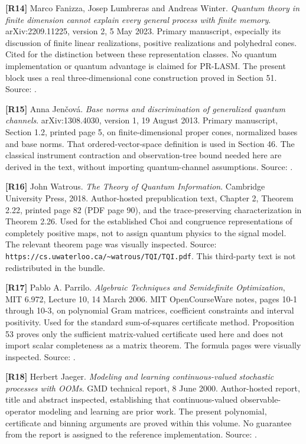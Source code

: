 \documentclass[11pt,letterpaper]{article}
\begin{document}
\textbf{{[}R14{]}} Marco Fanizza, Josep Lumbreras and Andreas Winter.
\emph{Quantum theory in finite dimension cannot explain every general
process with finite memory}. arXiv:2209.11225, version 2, 5 May 2023.
Primary manuscript, especially its discussion of finite linear
realizations, positive realizations and polyhedral cones. Cited for the
distinction between these representation classes. No quantum
implementation or quantum advantage is claimed for PR-LASM. The present
block uses a real three-dimensional cone construction proved in Section
51. Source: .

\textbf{{[}R15{]}} Anna Jenčová. \emph{Base norms and discrimination of
generalized quantum channels}. arXiv:1308.4030, version 1, 19 August
2013. Primary manuscript, Section 1.2, printed page 5, on
finite-dimensional proper cones, normalized bases and base norms. That
ordered-vector-space definition is used in Section 46. The classical
instrument contraction and observation-tree bound needed here are
derived in the text, without importing quantum-channel assumptions.
Source: .

\textbf{{[}R16{]}} John Watrous. \emph{The Theory of Quantum
Information}. Cambridge University Press, 2018. Author-hosted
prepublication text, Chapter 2, Theorem 2.22, printed page 82 (PDF page
90), and the trace-preserving characterization in Theorem 2.26. Used for
the established Choi and congruence representations of completely
positive maps, not to assign quantum physics to the signal model. The
relevant theorem page was visually inspected. Source:
\texttt{https://cs.uwaterloo.ca/\textasciitilde{}watrous/TQI/TQI.pdf}.
This third-party text is not redistributed in the bundle.

\textbf{{[}R17{]}} Pablo A. Parrilo. \emph{Algebraic Techniques and
Semidefinite Optimization}, MIT 6.972, Lecture 10, 14 March 2006. MIT
OpenCourseWare notes, pages 10-1 through 10-3, on polynomial Gram
matrices, coefficient constraints and interval positivity. Used for the
standard sum-of-squares certificate method. Proposition 53 proves only
the sufficient matrix-valued certificate used here and does not import
scalar completeness as a matrix theorem. The formula pages were visually
inspected. Source:
.

\textbf{{[}R18{]}} Herbert Jaeger. \emph{Modeling and learning
continuous-valued stochastic processes with OOMs}. GMD technical report,
8 June 2000. Author-hosted report, title and abstract inspected,
establishing that continuous-valued observable-operator modeling and
learning are prior work. The present polynomial, certificate and binning
arguments are proved within this volume. No guarantee from the report is
assigned to the reference implementation. Source:
.
\end{document}
